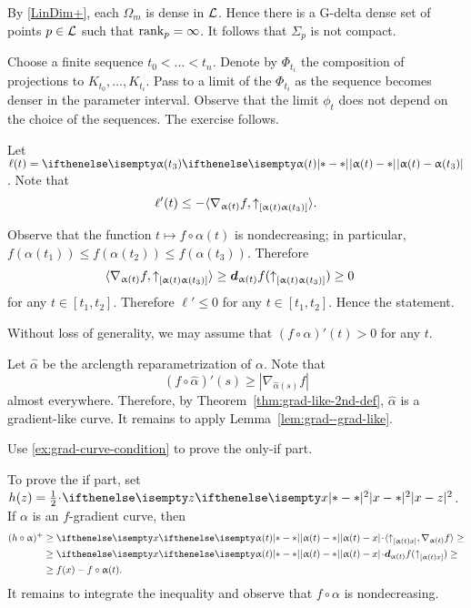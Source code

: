 By \ref{LinDim+}, each $\Omega_m$ is dense in $\mathcal{L}$.
Hence there is a G-delta dense set of points $p\in\spc{L}$ such that $\mathop{\rm rank}\nolimits_p=\infty$.
It follows that $\Sigma_p$ is not compact.

Choose a finite sequence $t_0<\dots<t_n$.
Denote by $\Phi_{t_i}$ the composition of projections to $K_{t_0},\dots, K_{t_i}$.
Pass to a limit of the $\Phi_{t_i}$ as the sequence becomes denser in the parameter interval. Observe that the limit $\phi_t$ does not depend on the choice of the sequences. The exercise follows. 


Let $\ell(t)=\dist{\alpha(t)}{\alpha(t_3)}{}$.
Note that 
\[\ell'(t)\le -\langle \nabla_{\alpha(t)}f,\dir{\alpha(t)}{\alpha(t_3)}\rangle.\]

Observe that the function $t\mapsto f\circ\alpha(t)$ is nondecreasing;
in particular, $f(\alpha(t_1))\le f(\alpha(t_2))\le f(\alpha(t_3))$.
Therefore 
\begin{align*}\langle \nabla_{\alpha(t)}f,\dir{\alpha(t)}{\alpha(t_3)}\rangle&\ge\dd_{\alpha(t)}f(\dir{\alpha(t)}{\alpha(t_3)})\ge 0
\end{align*}
for any $t\in[t_1,t_2]$.
Therefore $\ell'\le 0$ for any $t\in[t_1,t_2]$.
Hence the statement.

Without loss of generality, we may assume that $(f\circ\alpha)'(t)>0$ for any $t$.

Let $\hat\alpha$ be the arclength reparametrization of $\alpha$.
Note that 
\[(f\circ\hat\alpha)'(s)\ge |\nabla_{\hat\alpha(s)}f|\]
almost everywhere.
Therefore, by Theorem~\ref{thm:grad-like-2nd-def}, $\hat\alpha$ is a gradient-like curve.
It remains to apply Lemma~\ref{lem:grad--grad-like}.

Use \ref{ex:grad-curve-condition} to prove the only-if part.

To prove the if part, set $h(z)=\tfrac12\cdot\dist[2]{x}{z}{}$.
If $\alpha$ is an $f$-gradient curve, then 
\begin{align*}
(h\circ\alpha)^+&\ge \dist{\alpha(t)}{x}{}\cdot\langle\dir{\alpha(t)}{x},\nabla_{\alpha(t)}f\rangle\ge
\\
&\ge \dist{\alpha(t)}{x}{}\cdot\dd_{\alpha(t)}f(\dir{\alpha(t)}{x})\ge 
\\
&\ge f(x)-f\circ\alpha(t).
\end{align*}
It remains to integrate the inequality and observe that $f\circ\alpha$ is nondecreasing.

